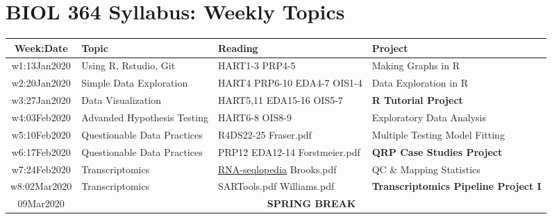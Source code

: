 \documentclass[11pt]{article} %
\begin{document}
\section{BIOL 364 Syllabus: Weekly Topics}
\begin{table}[ht] 
	\centering %
	\begin{tabular}{| c | m{5cm} | m{3cm} | m{5.5cm} |} %
	\hline %
	{\bf Week:Date} & {\bf Topic} & {\bf Reading} & {\bf Project}  \\ %
	\hline 
	\hline %
  w1:13Jan2020 & Using R, Rstudio, Git & HART1-3 \newline PRP4-5 & Making Graphs in R \\ %
	\hline
	w2:20Jan2020 & Simple Data Exploration & HART4 \newline PRP6-10 \newline EDA4-7 \newline OIS1-4 & Data Exploration in R \\ 
	\hline
	w3:27Jan2020 & Data Visualization & HART5,11 \newline EDA15-16 \newline OIS5-7 & {\bf R Tutorial Project}\\ 
	\hline 
	w4:03Feb2020 & Advanded Hypothesis Testing & HART6-8 \newline OIS8-9 & Exploratory Data Analysis \\ 
	\hline 
	w5:10Feb2020 & Questionable Data Practices & R4DS22-25 \newline Fraser.pdf & Multiple Testing \newline Model Fitting \\ 
	\hline 
	w6:17Feb2020 & Questionable Data Practices & PRP12 \newline EDA12-14 \newline Forstmeier.pdf & {\bf QRP Case Studies Project} \\ 
	\hline 
	w7:24Feb2020 & Transcriptomics & \href{https://rnaseq.uoregon.edu/}{RNA-seqlopedia} \newline Brooks.pdf & QC \& Mapping Statistics\\ 
	\hline 
	w8:02Mar2020 & Transcriptomics  & SARTools.pdf \newline Williams.pdf & {\bf Transcriptomics Pipeline Project I}\\ 
	\hline 
	09Mar2020 & \multicolumn{3}{c}{\bf SPRING BREAK}\\ 

\end{tabular}
\end{table}
\end{document}
